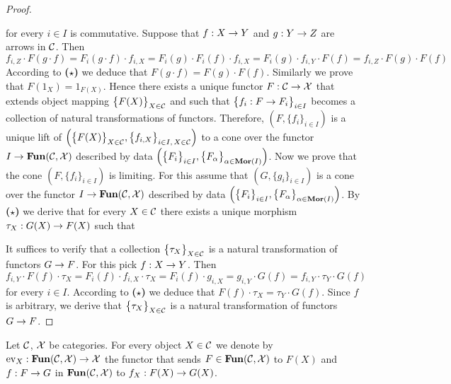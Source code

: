 \begin{proof}
\begin{center}
\end{center}
for every $i\in I$ is commutative. Suppose that $f:X\rightarrow Y$ and $g:Y\rightarrow Z$ are arrows in ${\mathcal C}$. Then
$$f_{i,Z}\cdot F(g\cdot f)=F_i(g\cdot f)\cdot f_{i,X}=F_i(g)\cdot F_i(f)\cdot f_{i,X}=F_i(g)\cdot f_{i,Y}\cdot F(f)=f_{i,Z}\cdot F(g)\cdot F(f)$$
According to \textbf{($\star$)} we deduce that $F(g\cdot f)=F(g)\cdot F(f)$. Similarly we prove that $F(1_X)=1_{F(X)}$. Hence there exists a unique functor $F:{\mathcal C}\rightarrow {\mathcal X}$ that extends object mapping $\big\{F(X)\big\}_{X\in {\mathcal C}}$ and such that $\big\{f_i:F\rightarrow F_i\big\}_{i\in I}$ becomes a collection of natural transformations of functors. Therefore, $\left(F,\big\{f_i\big\}_{i\in I}\right)$ is a unique lift of $\left(\big\{F(X)\big\}_{X\in {\mathcal C}},\big\{f_{i,X}\big\}_{i\in I,\,X\in {\mathcal C}}\right)$ to a cone over the functor $I\rightarrow \mathbf{Fun}({\mathcal C},{\mathcal X})$ described by data $\left(\big\{F_i\big\}_{i\in I},\big\{F_{\alpha}\big\}_{\alpha \in \mathbf{Mor}(I)}\right)$. Now we prove that the cone $\left(F,\big\{f_i\big\}_{i\in I}\right)$ is limiting. For this assume that $\left(G,\big\{g_i\big\}_{i\in I}\right)$ is a cone over the functor $I\rightarrow \mathbf{Fun}({\mathcal C},{\mathcal X})$ described by data $\left(\big\{F_i\big\}_{i\in I},\big\{F_{\alpha}\big\}_{\alpha \in \mathbf{Mor}(I)}\right)$. By \textbf{($\star$)} we derive that for every $X\in {\mathcal C}$ there exists a unique morphism $\tau_X:G(X)\rightarrow F(X)$ such that
\begin{center}
\end{center}
It suffices to verify that a collection $\big\{\tau_X\big\}_{X\in {\mathcal C}}$ is a natural transformation of functors $G\rightarrow F$. For this pick $f:X\rightarrow Y$. Then 
$$f_{i,Y}\cdot F(f)\cdot \tau_X=F_i(f)\cdot f_{i,X}\cdot \tau_X=F_i(f)\cdot g_{i,X}=g_{i,Y}\cdot G(f)=f_{i,Y}\cdot \tau_Y\cdot G(f)$$
for every $i\in I$. According to \textbf{($\star$)} we deduce that $F(f)\cdot \tau_X=\tau_Y\cdot G(f)$. Since $f$ is arbitrary, we derive that $\big\{\tau_X\big\}_{X\in {\mathcal C}}$ is a natural transformation of functors $G\rightarrow F$.
\end{proof}
\noindent
Let ${\mathcal C}$, ${\mathcal X}$ be categories. For every object $X\in {\mathcal C}$ we denote by $\mathrm{ev}_X:\mathbf{Fun}({\mathcal C},{\mathcal X})\rightarrow {\mathcal X}$ the functor that sends $F\in \mathbf{Fun}({\mathcal C},{\mathcal X})$ to $F(X)$ and $f:F\rightarrow G$ in $\mathbf{Fun}({\mathcal C},{\mathcal X})$ to $f_X:F(X)\rightarrow G(X)$. 

